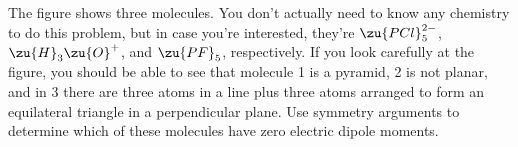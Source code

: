 The figure shows three molecules. You don't actually need to know any chemistry to do
this problem, but in case you're interested, they're $\zu{PCl}_5^{2-}$,
$\zu{H}_3\zu{O}^+$, and $\zu{PF}_5$, respectively. If you look carefully at the figure,
you should be able to see that molecule 1 is a pyramid, 2 is not planar, and
in 3 there are three atoms in a line plus three atoms arranged to form an equilateral
triangle in a perpendicular plane. Use symmetry arguments to determine which of
these molecules have zero electric dipole moments.

